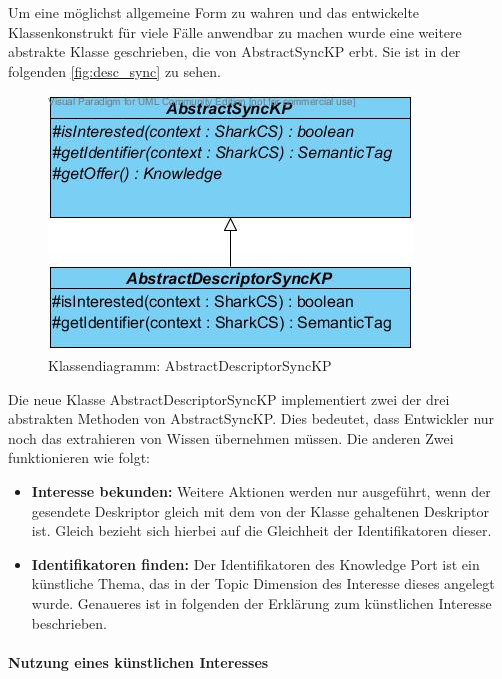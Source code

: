\documentclass[a4paper]{article}
\begin{document}
	Um eine möglichst allgemeine Form zu wahren und das entwickelte Klassenkonstrukt
	für viele Fälle anwendbar zu machen wurde eine weitere abstrakte Klasse
	geschrieben, die von AbstractSyncKP erbt. Sie ist in der folgenden
	\autoref{fig:desc_sync} zu sehen.
	
	\begin{figure}[H]
		\includegraphics[width=\linewidth]{../Bilder/desc_sync.jpg}
		\caption{Klassendiagramm: AbstractDescriptorSyncKP}
		\label{fig:desc_sync}
	\end{figure}	
	
	Die neue Klasse AbstractDescriptorSyncKP implementiert zwei der drei
	abstrakten Methoden von AbstractSyncKP. Dies bedeutet, dass Entwickler
	nur noch das extrahieren von Wissen übernehmen müssen. Die anderen
	Zwei funktionieren wie folgt:
	
	\begin{itemize}
		\item \textbf{Interesse bekunden:} Weitere Aktionen werden nur ausgeführt,
		wenn der gesendete Deskriptor gleich mit dem von der Klasse gehaltenen
		Deskriptor ist. Gleich bezieht sich hierbei auf die Gleichheit der
		Identifikatoren dieser.
		\item \textbf{Identifikatoren finden:} Der Identifikatoren des Knowledge
		Port ist ein künstliche Thema, das in der Topic Dimension des Interesse
		dieses angelegt wurde. Genaueres ist in folgenden der Erklärung zum 
		künstlichen Interesse beschrieben.
	\end{itemize} 
	
	\paragraph{Nutzung eines künstlichen Interesses}\mbox{} \\
	
\end{document}
